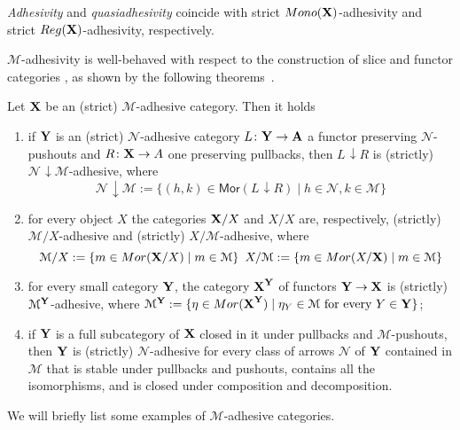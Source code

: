 \documentclass[a4paper,UKenglish,cleveref,pdftex,thm-restate,numberwithinsect]{lipics-v2021}
\def\X{\textbf {\textup{X}}}
\def\Y{\textbf {\textup{Y}}}
\def\A{\textbf {\textup{A}}}
\newcommand{\comma}[2]{#1\hspace{1pt} {\downarrow}#2}
\newcommand{\mor}{\mathsf{Mor}}
\newcommand{\mon}{\mathsf{Mono}}
\newcommand{\reg}{\mathsf{Reg}}
\begin{document}
\begin{remark}
	\label{rem:salva}
	\emph{Adhesivity} and \emph{quasiadhesivity} 
	\cite{lack2005adhesive,garner2012axioms} coincide with strict
	$\mon(\X) $-adhesivity and strict $\reg(\X)$-adhesivity,
	respectively.
\end{remark}


$\mathcal{M}$-adhesivity is well-behaved with respect to  the construction of slice and functor categories \cite{mac2013categories}, as shown by the following theorems~\cite{ehrig2006fundamentals,lack2005adhesive}.

\begin{proposition}
	\label{thm:slice-functors}
	Let $\X$ be an (strict) $\mathcal{M}$-adhesive category. Then it holds
	\begin{enumerate}
		\item if $\Y$ is an (strict) $\mathcal{N}$-adhesive category $L\colon \Y\to \A$ a functor preserving $\mathcal{N}$-pushouts and $R\colon \X\to A$ one preserving pullbacks, then $\comma{L}{R}$ is (strictly) $\comma{\mathcal{N}}{\mathcal{M}}$-adhesive, where
		\[\comma{\mathcal{N}}{\mathcal{M}}:=\{(h,k) \in \mor(\comma{L}{R}) \mid h\in \mathcal{N}, k\in \mathcal{M}\}\]
		\item for every object $X$
		the categories $\X/X$  and $X/X$ are, respectively, (strictly) $\mathcal{M}/X$-adhesive and (strictly) $X/\mathcal{M}$-adhesive, where
		\[\mathcal{M}/X:=\{m\in \mor(\X/X) \mid m\in
		\mathcal{M}\} \hspace{5pt} X/\mathcal{M}:=\{m\in \mor(X/\X) \mid m\in \mathcal{M}\}\]
		\item for every small category $\Y$, the category $\X^\Y$ of
		functors $\Y\to \X$ is (strictly) $\mathcal{M}^{\Y}$-adhesive, where
		$\mathcal{M}^{\Y}:=\{\eta \in \mor(\X^\Y) \mid \eta_Y \in
		\mathcal{M} \text{ for every } Y\in \Y\}$;
		\item if $\Y$ is a full subcategory of $\X$ closed in it under pullbacks and $\mathcal{M}$-pushouts, then $\Y$ is (strictly) $\mathcal{N}$-adhesive for every class of arrows $\mathcal{N}$ of $\Y$ contained in $\mathcal{M}$ that is stable under pullbacks and pushouts, contains all the isomorphisms, and is closed under composition and decomposition.
	\end{enumerate} 
\end{proposition}

We will briefly list some examples of $\mathcal{M}$-adhesive categories.
\end{document}
